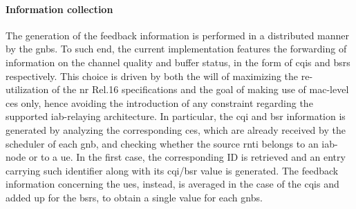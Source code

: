 \paragraph{Information collection}
The generation of the feedback information is performed in a distributed manner by  the \glspl{gnb}. To such end, the current implementation features the forwarding of information on the channel quality and buffer status, in the form of \glspl{cqi} and \glspl{bsr} respectively. This choice is driven by both the will of maximizing the re-utilization of the \gls{nr} Rel.16 specifications and the goal of making use of \gls{mac}-level \glspl{ce} only, hence avoiding the introduction of any constraint regarding the supported \gls{iab}-relaying architecture.
In particular, the \gls{cqi} and \gls{bsr} information is generated by analyzing the corresponding \glspl{ce}, which are already received by the scheduler of each \gls{gnb}, and checking whether the source \gls{rnti} belongs to an \gls{iab}-node or to a \gls{ue}. In the first case, the corresponding ID
is retrieved and an entry carrying such identifier along with its \gls{cqi}/\gls{bsr} value is generated. 
The feedback information concerning the \glspl{ue}, instead, is averaged in the case of the \glspl{cqi} and added up for the \glspl{bsr}, to obtain a single value for each \glspl{gnb}.

